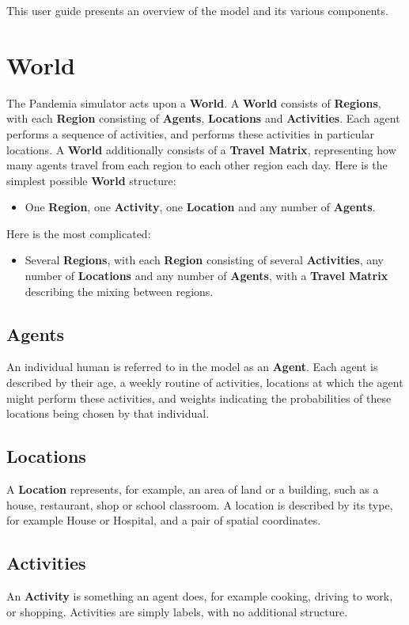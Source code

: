 \documentclass[10pt,letterpaper]{article}
\begin{document}
This user guide presents an overview of the model and its various components.

\section{World}

The Pandemia simulator acts upon a \textbf{World}. A \textbf{World} consists of \textbf{Regions}, with each \textbf{Region} consisting of \textbf{Agents}, \textbf{Locations} and \textbf{Activities}. Each agent performs a sequence of activities, and performs these activities in particular locations. A \textbf{World} additionally consists of a \textbf{Travel Matrix}, representing how many agents travel from each region to each other region each day. Here is the simplest possible \textbf{World} structure:
\begin{itemize}
\item One \textbf{Region}, one \textbf{Activity}, one \textbf{Location} and any number of \textbf{Agents}.
\end{itemize}
Here is the most complicated:
\begin{itemize}
\item Several \textbf{Regions}, with each \textbf{Region} consisting of several \textbf{Activities}, any number of \textbf{Locations} and any number of \textbf{Agents}, with a \textbf{Travel Matrix} describing the mixing between regions.
\end{itemize}

\subsection{Agents}
An individual human is referred to in the model as an \textbf{Agent}. Each agent is described by their age, a weekly routine of activities, locations at which the agent might perform these activities, and weights indicating the probabilities of these locations being chosen by that individual.

\subsection{Locations}
A \textbf{Location} represents, for example, an area of land or a building, such as a house, restaurant, shop or school classroom. A location is described by its type, for example House or Hospital, and a pair of spatial coordinates.

\subsection{Activities}
An \textbf{Activity} is something an agent does, for example cooking, driving to work, or shopping. Activities are simply labels, with no additional structure.
\end{document}
